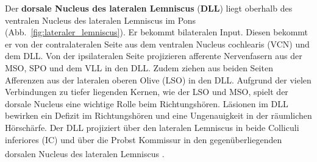Der \textbf{dorsale Nucleus des lateralen Lemniscus} (\textbf{DLL}) liegt oberhalb des ventralen Nucleus des lateralen Lemniscus im Pons (Abb.~\ref{fig:lateraler_lemniscus}). Er bekommt bilateralen Input. Diesen bekommt er von der contralateralen Seite aus dem ventralen Nucleus cochlearis (VCN) und dem DLL. Von der ipsilateralen Seite projizieren afferente Nervenfasern aus der MSO, SPO und dem VLL in den DLL. Zudem ziehen aus beiden Seiten Afferenzen aus der lateralen oberen Olive (LSO) in den DLL.
Aufgrund der vielen Verbindungen zu tiefer liegenden Kernen, wie der LSO und MSO, spielt der dorsale Nucleus eine wichtige Rolle beim Richtungshören. Läsionen im DLL bewirken ein Defizit im Richtungshören und eine Ungenauigkeit in der räumlichen Hörschärfe. 
Der DLL projiziert über den lateralen Lemniscus in beide Colliculi inferiores (IC) und über die Probst Kommissur in den gegenüberliegenden dorsalen Nucleus des lateralen Lemniscus
\textsuperscript{\cite[Kap.~29]{paxinos2014rat}}.

